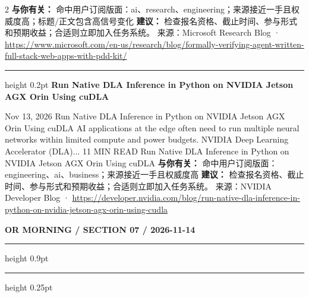 \documentclass[10.5pt]{ctexart}
\begin{document}
\begin{multicols}{2}
\textbf{与你有关：} 命中用户订阅版面：ai、research、engineering；来源接近一手且权威度高；标题/正文包含高信号变化
\textbf{建议：} 检查报名资格、截止时间、参与形式和预期收益；合适则立即加入任务系统。
{\footnotesize\color{ormuted} 来源：Microsoft Research Blog · \url{https://www.microsoft.com/en-us/research/blog/formally-verifying-agent-written-full-stack-web-apps-with-pdd-kit/}}
\vspace{2mm}
\hrule height 0.2pt
\vspace{2mm}
{\large\bfseries Run Native DLA Inference in Python on NVIDIA Jetson AGX Orin Using cuDLA}\par
Nov 13, 2026 Run Native DLA Inference in Python on NVIDIA Jetson AGX Orin Using cuDLA AI applications at the edge often need to run multiple neural networks within limited compute and power budgets. NVIDIA Deep Learning Accelerator (DLA)... 11 MIN READ Run Native DLA Inference in Python on NVIDIA Jetson AGX Orin Using cuDLA
\textbf{与你有关：} 命中用户订阅版面：engineering、ai、business；来源接近一手且权威度高
\textbf{建议：} 检查报名资格、截止时间、参与形式和预期收益；合适则立即加入任务系统。
{\footnotesize\color{ormuted} 来源：NVIDIA Developer Blog · \url{https://developer.nvidia.com/blog/run-native-dla-inference-in-python-on-nvidia-jetson-agx-orin-using-cudla}}
\end{multicols}
\newpage
{\small\bfseries OR MORNING / SECTION 07 / 2026-11-14}
\vspace{2mm}
\hrule height 0.9pt
\vspace{1.5mm}
\hrule height 0.25pt
\vspace{4mm}
\end{document}
